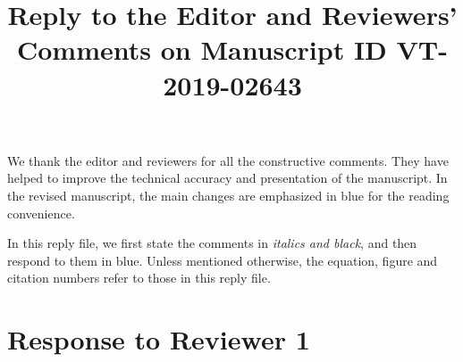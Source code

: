 \documentclass[12pt,onecolumn]{IEEEtran}
\newcommand{\blue}{\color{blue}}
\newcommand{\black}{\color{black}}
\newcommand{\spaceblank}{\vskip 4mm}
\begin{document}
\title{Reply to the Editor and Reviewers' Comments on Manuscript ID VT-2019-02643}

\author{}
\maketitle

We thank the editor and reviewers for all the constructive comments. They have helped to improve the technical accuracy and presentation of the manuscript. In the revised manuscript, the main changes are emphasized in {\blue blue} for the reading convenience.

In this reply file, we first state the comments in {\em \black italics and black}, and then respond to them in {\color{blue}blue}. Unless mentioned otherwise, the equation, figure and citation numbers refer to those in this reply file.


\section{Response to Reviewer 1}
\spaceblank
{}
\spaceblank	
\end{document}
